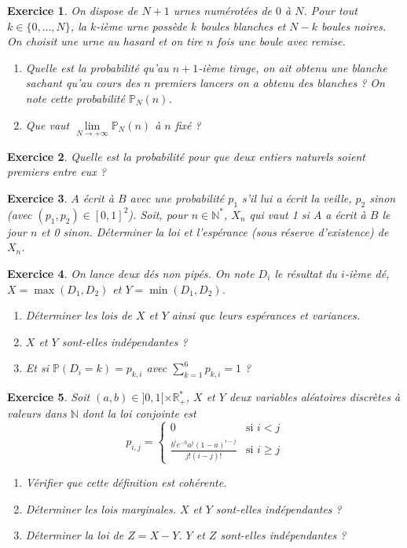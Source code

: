 \documentclass[12pt]{article}
\newtheorem{exercise}{Exercice}[section]
\theoremstyle{remark}
\theoremstyle{remark}
\newcommand{\R}{\mathbb{R}}
\newcommand{\N}{\mathbb{N}}
\renewcommand{\P}{\mathbb{P}}
\begin{document}
\begin{exercise}
	On dispose de $N+1$ urnes numérotées de $0$ à $N$. Pour tout
	$k\in\{0,\dots,N\}$, la $k$-ième urne possède $k$ boules blanches et $N-k$
	boules noires. On choisit une urne au hasard et on tire $n$ fois une boule
	avec remise.
	\begin{enumerate}
		\item Quelle est la probabilité qu'au $n+1$-ième tirage, on ait obtenu
		une blanche sachant qu'au cours des $n$ premiers lancers on a obtenu des
		blanches ? On note cette probabilité $\P_{N}(n)$.
		\item Que vaut $\lim\limits_{N\to+\infty}\P_{N}(n)$ à $n$ fixé ?
	\end{enumerate}
\end{exercise}

\begin{exercise}
	Quelle est la probabilité pour que deux entiers naturels soient premiers
	entre eux ?
\end{exercise}

\begin{exercise}
	$A$ écrit à $B$ avec une probabilité $p_{1}$ s'il lui a écrit la veille,
	$p_{2}$ sinon (avec $(p_{1},p_{2})\in[0,1]^{2}$). Soit, pour $n\in\N^{*}$,
	$X_{n}$ qui vaut 1 si $A$ a écrit à $B$ le jour $n$ et 0 sinon. Déterminer
	la loi et l'espérance (sous réserve d'existence) de $X_{n}$.
\end{exercise}

\begin{exercise}
	On lance deux dés non pipés. On note $D_{i}$ le résultat du $i$-ième dé,
	$X=\max(D_{1},D_{2})$ et $Y=\min(D_{1},D_{2})$.
	\begin{enumerate}
		\item Déterminer les lois de $X$ et $Y$ ainsi que leurs espérances et variances.
		\item $X$ et $Y$ sont-elles indépendantes ?
		\item Et si $\P(D_{i}=k)=p_{k,i}$ avec $\sum_{k=1}^{6}p_{k,i}=1$ ?
	\end{enumerate}
\end{exercise}

\begin{exercise}
	Soit $(a,b)\in]0,1[\times\R_{+}^{*}$, $X$ et $Y$ deux variables aléatoires
	discrètes à valeurs dans $\N$ dont la loi conjointe est
	$$
	p_{i,j}=
	\left\{
		\begin{array}{cc}
			0 & \text{si }i<j\\
			\frac{b^{i}e^{-b}a^{j}(1-a)^{i-j}}{j!(i-j)!} & \text{si }i\geqslant j
		\end{array}
	\right.
	$$
	\begin{enumerate}
		\item Vérifier que cette définition est cohérente.
		\item Déterminer les lois marginales. $X$ et $Y$ sont-elles
		indépendantes ?
		\item Déterminer la loi de $Z=X-Y$. $Y$ et $Z$ sont-elles indépendantes ?
	\end{enumerate}
\end{exercise}
\end{document}

